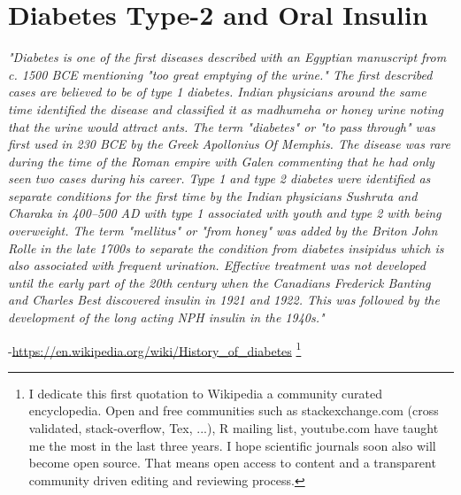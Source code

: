 \chapter{Diabetes Type-2 and Oral Insulin}


\textit{"Diabetes is one of the first diseases described with an Egyptian manuscript from c. 1500 BCE mentioning "too great emptying of the urine." The first described cases are believed to be of type 1 diabetes. Indian physicians around the same time identified the disease and classified it as madhumeha or honey urine noting that the urine would attract ants. The term "diabetes" or "to pass through" was first used in 230 BCE by the Greek Apollonius Of Memphis. The disease was rare during the time of the Roman empire with Galen commenting that he had only seen two cases during his career. Type 1 and type 2 diabetes were identified as separate conditions for the first time by the Indian physicians Sushruta and Charaka in 400–500 AD with type 1 associated with youth and type 2 with being overweight. The term "mellitus" or "from honey" was added by the Briton John Rolle in the late 1700s to separate the condition from diabetes insipidus which is also associated with frequent urination. Effective treatment was not developed until the early part of the 20th century when the Canadians Frederick Banting and Charles Best discovered insulin in 1921 and 1922. This was followed by the development of the long acting NPH insulin in the 1940s."}

-\url{https://en.wikipedia.org/wiki/History_of_diabetes} \footnote{I dedicate this first quotation to Wikipedia a community curated encyclopedia. Open and free communities such as stackexchange.com (cross validated, stack-overflow, Tex, ...), R mailing list, youtube.com have taught me the most in the last three years. I hope scientific journals soon also will become open source. That means open access to content and a transparent community driven editing and reviewing process.}
\newpage



